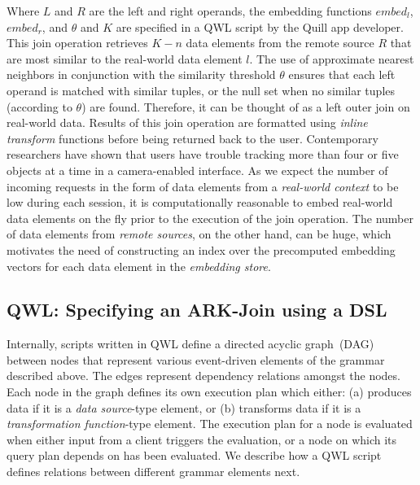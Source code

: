 \documentclass[11pt]{article}
\begin{document}
Where $L$ and $R$ are the left and right operands, the embedding functions $embed_l$, $embed_r$, and $\theta$ and $K$ are specified in a QWL script by the Quill app developer. This join operation retrieves $K - n$ data elements from the remote source $R$ that are most similar to the real-world data element $l$. The use of approximate nearest neighbors in conjunction with the similarity threshold $\theta$ ensures that each left operand is matched with similar tuples, or the null set when no similar tuples (according to $\theta$) are found. Therefore, it can be thought of as a left outer join on real-world data.
Results of this join operation are formatted using \emph{inline transform} functions before being returned back to the user. Contemporary researchers have shown that users have trouble tracking more than four or five objects at a time \cite{cavanagh2005tracking} in a camera-enabled interface.
As we expect the number of incoming requests in the form of data elements from a \textit{real-world context} to be low during each session, it is computationally reasonable to embed real-world data elements on the fly prior to the execution of the join operation. The number of data elements from \emph{remote sources}, on the other hand, can be huge, which motivates the need of constructing an index over the precomputed embedding vectors for each data element in the \emph{embedding store}.

\subsection{QWL: Specifying an ARK-Join using a DSL}
\label{sec:grammar:design}

Internally, scripts written in QWL define a directed acyclic graph~(DAG) between nodes that represent various event-driven elements of the grammar described above. The edges represent dependency relations amongst the nodes. Each node in the graph defines its own execution plan which either: (a) produces data if it is a \textit{data source}-type element, or (b) transforms data if it is a \textit{transformation function}-type element. The execution plan for a node is evaluated when either input from a client triggers the evaluation, or a node on which its query plan depends on has been evaluated. We describe how a QWL script defines relations between different grammar elements next.\vspace{0.05cm} 
\end{document}
